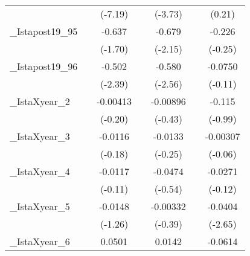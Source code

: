 {\begin{tabular}{l*{6}{c}}
            &                     &     (-7.19)         &                     &     (-3.73)         &                     &      (0.21)         \\
[1em]
\_Istapost19\_95&                     &      -0.637         &                     &      -0.679\sym{*}  &                     &      -0.226         \\
            &                     &     (-1.70)         &                     &     (-2.15)         &                     &     (-0.25)         \\
[1em]
\_Istapost19\_96&                     &      -0.502\sym{*}  &                     &      -0.580\sym{*}  &                     &     -0.0750         \\
            &                     &     (-2.39)         &                     &     (-2.56)         &                     &     (-0.11)         \\
[1em]
\_IstaXyear\_2&                     &    -0.00413         &                     &    -0.00896         &                     &      -0.115         \\
            &                     &     (-0.20)         &                     &     (-0.43)         &                     &     (-0.99)         \\
[1em]
\_IstaXyear\_3&                     &     -0.0116         &                     &     -0.0133         &                     &    -0.00307         \\
            &                     &     (-0.18)         &                     &     (-0.25)         &                     &     (-0.06)         \\
[1em]
\_IstaXyear\_4&                     &     -0.0117         &                     &     -0.0474         &                     &     -0.0271         \\
            &                     &     (-0.11)         &                     &     (-0.54)         &                     &     (-0.12)         \\
[1em]
\_IstaXyear\_5&                     &     -0.0148         &                     &    -0.00332         &                     &     -0.0404\sym{*}  \\
            &                     &     (-1.26)         &                     &     (-0.39)         &                     &     (-2.65)         \\
[1em]
\_IstaXyear\_6&                     &      0.0501\sym{**} &                     &      0.0142         &                     &     -0.0614         \\

\end{tabular}}
